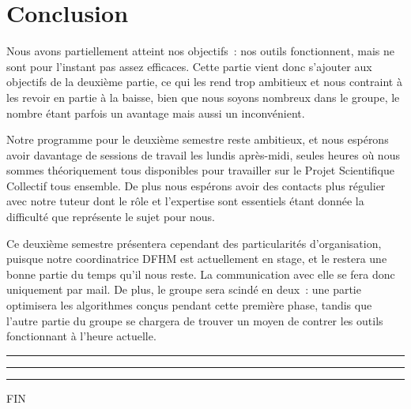 \documentclass[a4paper, 12pt,twoside]{article}
\begin{document}


\clearpage
{}
\section*{Conclusion}
    Nous avons partiellement atteint nos objectifs~: nos outils fonctionnent, mais ne sont pour l'instant pas assez efficaces. Cette partie vient donc s'ajouter aux objectifs de la deuxième partie, ce qui les rend trop ambitieux et nous contraint à les revoir en partie à la baisse, bien que nous soyons nombreux dans le groupe, le nombre étant parfois un avantage mais aussi un inconvénient.
    
    Notre programme pour le deuxième semestre reste ambitieux, et nous espérons avoir davantage de sessions de travail les lundis après-midi, seules heures où nous sommes théoriquement tous disponibles pour travailler sur le Projet Scientifique Collectif tous ensemble. De plus nous espérons avoir des contacts plus régulier avec notre tuteur dont le rôle et l'expertise sont essentiels étant donnée la difficulté que représente le sujet pour nous.
    
    Ce deuxième semestre présentera cependant des particularités d'organisation, puisque notre coordinatrice DFHM est actuellement en stage, et le restera une bonne partie du temps qu'il nous reste. La communication avec elle se fera donc uniquement par mail. De plus, le groupe sera scindé en deux~: une partie optimisera les algorithmes conçus pendant cette première phase, tandis que l'autre partie du groupe se chargera de trouver un moyen de contrer les outils fonctionnant à l'heure actuelle.
    
\begin{center}
\color{bleu303}

\rule{0.3\textwidth}{0.2mm}\vspace*{-3.5mm}

\rule{0.5\textwidth}{0.6mm}\vspace*{-3.8mm}

\rule{0.3\textwidth}{0.2mm}\vspace*{-1mm}

\sffamily FIN
\end{center}
\end{document}
